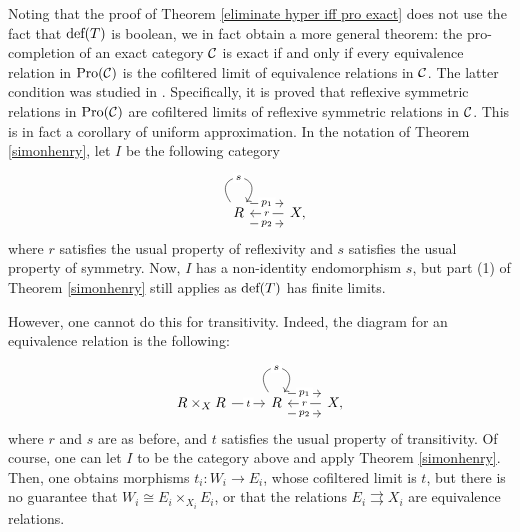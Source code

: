 Noting that the proof of Theorem \ref{eliminate hyper iff pro exact} does not use the fact that $\textup{def}(T)$ is boolean, we in fact obtain a more general theorem: the pro-completion of an exact category $\mathcal{C}$ is exact if and only if every equivalence relation in $\textup{Pro}(\mathcal{C})$ is the cofiltered limit of equivalence relations in $\mathcal{C}$. The latter condition was studied in \cite[Ch.~III \S4]{meyerphd}. Specifically, it is proved that reflexive symmetric relations in $\textup{Pro}(\mathcal{C})$ are cofiltered limits of reflexive symmetric relations in $\mathcal{C}$. This is in fact a corollary of uniform approximation. In the notation of Theorem \ref{simonhenry}, let $I$ be the following category
    \[\begin{tikzcd}
    	R & {X,}
    	\arrow["s"{description}, from=1-1, to=1-1, loop, in=55, out=125, distance=10mm]
    	\arrow["{p_1}"{description}, shift left=3, from=1-1, to=1-2]
    	\arrow["{p_2}"{description}, shift right=3, from=1-1, to=1-2]
    	\arrow["r"{description}, from=1-2, to=1-1]
    \end{tikzcd}\]
where $r$ satisfies the usual property of reflexivity and $s$ satisfies the usual property of symmetry. Now, $I$ has a non-identity endomorphism $s$, but part (1) of Theorem \ref{simonhenry} still applies as $\textup{def}(T)$ has finite limits.

However, one cannot do this for transitivity. Indeed, the diagram for an equivalence relation is the following:
    \[\begin{tikzcd}
    	{R\times_X R} & R & {X,}
    	\arrow["t"{description}, from=1-1, to=1-2]
    	\arrow["s"{description}, from=1-2, to=1-2, loop, in=55, out=125, distance=10mm]
    	\arrow["{p_1}"{description}, shift left=3, from=1-2, to=1-3]
    	\arrow["{p_2}"{description}, shift right=3, from=1-2, to=1-3]
    	\arrow["r"{description}, from=1-3, to=1-2]
    \end{tikzcd}\]
where $r$ and $s$ are as before, and $t$ satisfies the usual property of transitivity. Of course, one can let $I$ to be the category above and apply Theorem \ref{simonhenry}. Then, one obtains morphisms $t_i:W_i\rightarrow E_i$, whose cofiltered limit is $t$, but there is no guarantee that $W_i \cong E_i\times_{X_i} E_i$, or that the relations $E_i\rightrightarrows X_i$ are equivalence relations.

